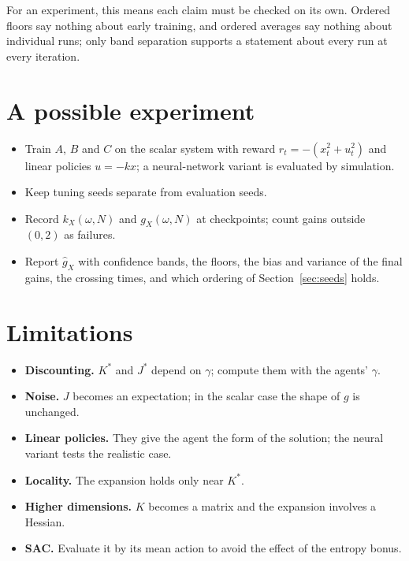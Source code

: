 \documentclass[11pt]{article}
\begin{document}
For an experiment, this means each claim must be checked on its own. Ordered floors say nothing about
early training, and ordered averages say nothing about individual runs; only band separation supports
a statement about every run at every iteration.

\section{A possible experiment}

\begin{itemize}
  \item Train $A$, $B$ and $C$ on the scalar system with reward $r_t = -(x_t^2 + u_t^2)$ and linear
    policies $u = -kx$; a neural-network variant is evaluated by simulation.
  \item Keep tuning seeds separate from evaluation seeds.
  \item Record $k_X(\omega, N)$ and $g_X(\omega, N)$ at checkpoints; count gains outside $(0, 2)$ as
    failures.
  \item Report $\hat g_X$ with confidence bands, the floors, the bias and variance of the final gains,
    the crossing times, and which ordering of Section~\ref{sec:seeds} holds.
\end{itemize}

\section{Limitations}
\label{sec:limitations}

\begin{itemize}
  \item \textbf{Discounting.} $K^*$ and $J^*$ depend on $\gamma$; compute them with the agents'
    $\gamma$.
  \item \textbf{Noise.} $J$ becomes an expectation; in the scalar case the shape of $g$ is unchanged.
  \item \textbf{Linear policies.} They give the agent the form of the solution; the neural variant
    tests the realistic case.
  \item \textbf{Locality.} The expansion holds only near $K^*$.
  \item \textbf{Higher dimensions.} $K$ becomes a matrix and the expansion involves a Hessian.
  \item \textbf{SAC.} Evaluate it by its mean action to avoid the effect of the entropy bonus.
\end{itemize}
\end{document}
